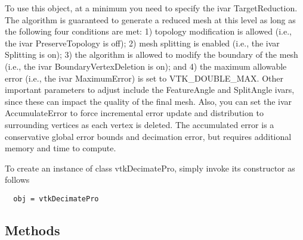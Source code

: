  To use this object, at a minimum you need to specify the ivar
 TargetReduction. The algorithm is guaranteed to generate a reduced mesh
 at this level as long as the following four conditions are met: 1)
 topology modification is allowed (i.e., the ivar PreserveTopology is off);
 2) mesh splitting is enabled (i.e., the ivar Splitting is on); 3) the
 algorithm is allowed to modify the boundary of the mesh (i.e., the ivar
 BoundaryVertexDeletion is on); and 4) the maximum allowable error (i.e.,
 the ivar MaximumError) is set to VTK\_DOUBLE\_MAX.  Other important
 parameters to adjust include the FeatureAngle and SplitAngle ivars, since
 these can impact the quality of the final mesh. Also, you can set the
 ivar AccumulateError to force incremental error update and distribution
 to surrounding vertices as each vertex is deleted. The accumulated error
 is a conservative global error bounds and decimation error, but requires
 additional memory and time to compute.

To create an instance of class vtkDecimatePro, simply
invoke its constructor as follows
\begin{verbatim}
  obj = vtkDecimatePro
\end{verbatim}
\subsection{Methods}


